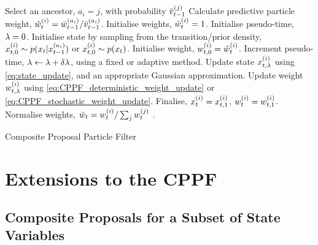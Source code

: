 \documentclass{article}
\begin{document}
\begin{algorithm} \label{alg:general_CPPF}
\begin{algorithmic}[1]
        \STATE Select an ancestor, $a_i=j$, with probability $\bar{v}_{t-1}^{(j)}$
        \STATE Calculate predictive particle weight, $\hat{w}_{t}^{(i)} = \bar{w}_{t-1}^{(a_i)} / \bar{v}_{t-1}^{(a_i)}$.
      \ELSE
        \STATE Initialise weights, $\hat{w}_{t}^{(i)} = 1$.
      \ENDIF
      \STATE Initialise pseudo-time, $\lambda=0$.
      \STATE Initialise state by sampling from the transition/prior density, $x_{t,0}^{(i)} \sim p(x_{t} | x_{t-1}^{(a_{i})})$ or $x_{t,0}^{(i)} \sim p(x_{t})$.
      \STATE Initialise weight, $w_{t,0}^{(i)} = \hat{w}_{t}^{(i)}$.
        \STATE Increment pseudo-time, $\lambda \leftarrow \lambda+\delta\lambda$, using a fixed or adaptive method.
        \STATE Update state $x_{t,\lambda}^{(i)}$ using \eqref{eq:state_update}, and an appropriate Gaussian approximation.
        \STATE Update weight $w_{t,\lambda}^{(i)}$ using \eqref{eq:CPPF_deterministic_weight_update} or \eqref{eq:CPPF_stochastic_weight_update}.
      \ENDWHILE
      \STATE Finalise, $x_{t}^{(i)} = x_{t,1}^{(i)}$, $w_{t}^{(i)} = w_{t,1}^{(i)}$.
    \ENDFOR
    \STATE Normalise weights, $\bar{w}_{t} = w_{t}^{(i)} / \sum_j w_{t}^{(j)}$ .
  \ENDFOR
\end{algorithmic}
\caption{Composite Proposal Particle Filter}
\end{algorithm}




\section{Extensions to the CPPF}

\subsection{Composite Proposals for a Subset of State Variables}\label{sec:cppf_for_state_subset}
\end{document}
